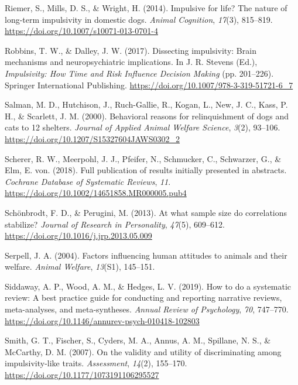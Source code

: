 \documentclass[
  ,pub,floatsintext]{apa6}
\newlength{\cslhangindent}
\newlength{\cslentryspacingunit} %
\newenvironment{CSLReferences}[2] %
 {%
  \setlength{\parindent}{0pt}
  \ifodd #1
  \let\oldpar\par
  \def\par{\hangindent=\cslhangindent\oldpar}
  \fi
  \setlength{\parskip}{#2\cslentryspacingunit}
 }%
 {}
\begin{document}
\begin{CSLReferences}{1}{0}
\leavevmode{}%
Riemer, S., Mills, D. S., \& Wright, H. (2014). Impulsive for life? {The} nature of long-term impulsivity in domestic dogs. \emph{Animal Cognition}, \emph{17}(3), 815--819. \url{https://doi.org/10.1007/s10071-013-0701-4}

\leavevmode{}%
Robbins, T. W., \& Dalley, J. W. (2017). Dissecting impulsivity: Brain mechanisms and neuropsychiatric implications. In J. R. Stevens (Ed.), \emph{Impulsivity: {How Time} and {Risk Influence Decision Making}} (pp. 201--226). {Springer International Publishing}. \url{https://doi.org/10.1007/978-3-319-51721-6_7}

\leavevmode{}%
Salman, M. D., Hutchison, J., Ruch-Gallie, R., Kogan, L., New, J. C., Kass, P. H., \& Scarlett, J. M. (2000). Behavioral reasons for relinquishment of dogs and cats to 12 shelters. \emph{Journal of Applied Animal Welfare Science}, \emph{3}(2), 93--106. \url{https://doi.org/10.1207/S15327604JAWS0302_2}

\leavevmode{}%
Scherer, R. W., Meerpohl, J. J., Pfeifer, N., Schmucker, C., Schwarzer, G., \& Elm, E. von. (2018). Full publication of results initially presented in abstracts. \emph{Cochrane Database of Systematic Reviews}, \emph{11}. \url{https://doi.org/10.1002/14651858.MR000005.pub4}

\leavevmode{}%
Schönbrodt, F. D., \& Perugini, M. (2013). At what sample size do correlations stabilize? \emph{Journal of Research in Personality}, \emph{47}(5), 609--612. \url{https://doi.org/10.1016/j.jrp.2013.05.009}

\leavevmode{}%
Serpell, J. A. (2004). Factors influencing human attitudes to animals and their welfare. \emph{Animal Welfare}, \emph{13}(S1), 145--151.

\leavevmode{}%
Siddaway, A. P., Wood, A. M., \& Hedges, L. V. (2019). How to do a systematic review: {A} best practice guide for conducting and reporting narrative reviews, meta-analyses, and meta-syntheses. \emph{Annual Review of Psychology}, \emph{70}, 747--770. \url{https://doi.org/10.1146/annurev-psych-010418-102803}

\leavevmode{}%
Smith, G. T., Fischer, S., Cyders, M. A., Annus, A. M., Spillane, N. S., \& McCarthy, D. M. (2007). On the validity and utility of discriminating among impulsivity-like traits. \emph{Assessment}, \emph{14}(2), 155--170. \url{https://doi.org/10.1177/1073191106295527}


\end{CSLReferences}
\end{document}
